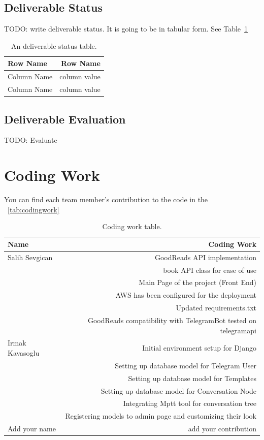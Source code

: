 \documentclass[a4paper]{article}
\begin{document}
\subsection{Deliverable Status}
TODO: write deliverable status. It is going to be in tabular form. See Table~\ref{tab:deliverablestatus}

\begin{table}
\centering
\begin{tabular}{l|r}
Row Name & Row Name \\\hline
Column Name & column value \\
Column Name & column value
\end{tabular}
\caption{\label{tab:deliverablestatus}An deliverable status table.}
\end{table}

\subsection{Deliverable Evaluation}
TODO: Evaluate

\newpage
\section{Coding Work}
You can find each team member's contribution to the code in the ~\autoref{tab:codingwork}

\begin{table}[!hb]
\centering
\begin{tabular}{l|r}
Name & Coding Work \\\hline
Salih Sevgican & GoodReads API implementation \\ 
 & book API class for ease of use \\
 & Main Page of the project (Front End)\\
 & AWS has been configured for the deployment\\
 & Updated requirements.txt\\
 & GoodReads compatibility with TelegramBot tested on telegramapi\\\hline
Irmak Kavasoglu & Initial environment setup for Django \\
& Setting up database model for Telegram User \\
& Setting up database model for Templates \\
& Setting up database model for Conversation Node \\
& Integrating Mptt tool for conversation tree \\
& Registering models to admin page and customizing their look \\\hline
Add your name & add your contribution
\end{tabular}
\caption{\label{tab:codingwork}Coding work table.}
\end{table}
\end{document}
